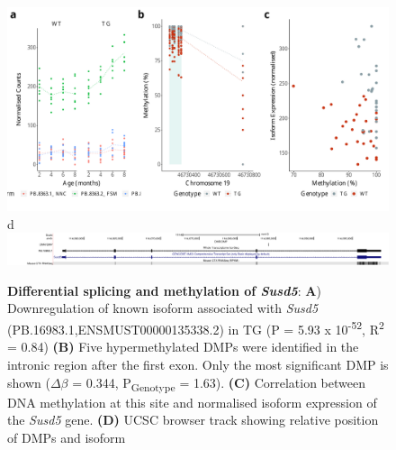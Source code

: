 \begin{figure}[]
	\includegraphics[page=4,scale = 0.4]{Figures/WholeDifferentialAnalysis_DMPDMR.pdf}
	\\
	\hspace*{0.2cm}\vspace{0.5cm}\large d
	\\
	\includegraphics[page=1,trim={1.5cm 0 0 0},scale = 0.9]{Figures/SUSD5_DMP.pdf}
	\captionsetup{width=0.95\textwidth}
	\caption[Differential splicing and methylation of \textit{Susd5}]%
	{\textbf{Differential splicing and methylation of \textit{Susd5}}: \textbf{A}) Downregulation of known isoform associated with \textit{Susd5} (PB.16983.1,ENSMUST00000135338.2) in TG (P = 5.93 x 10\textsuperscript{-52}, R\textsuperscript{2} = 0.84) \textbf{(B)} Five hypermethylated DMPs were identified in the intronic region after the first exon. Only the most significant DMP is shown ($\Delta$$\beta$ = 0.344, P\textsubscript{Genotype} = 1.63). \textbf{(C)} Correlation between DNA methylation at this site and normalised isoform expression of the \textit{Susd5} gene. \textbf{(D)} UCSC browser track showing relative position of DMPs and isoform}    
	\label{fig:IntMeth_Susd5}
\end{figure}

